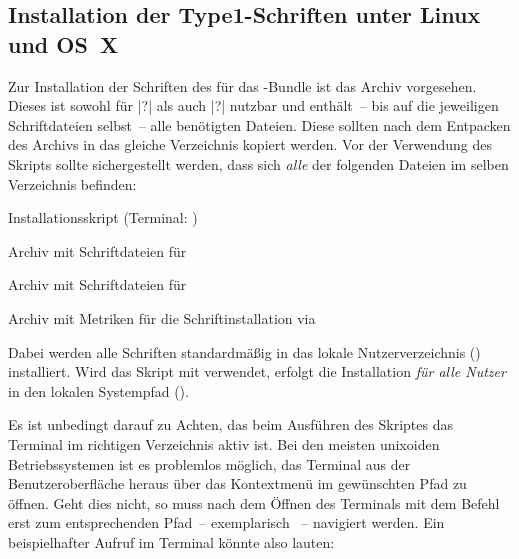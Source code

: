 \subsection{Installation der Type1-Schriften unter Linux und OS~X}
%
%
Zur Installation der Schriften des \CDs für das \TUDScript-Bundle ist das Archiv
%
{}
 vorgesehen. Dieses ist sowohl für |?| als auch 
|?| nutzbar und enthält~-- bis auf die jeweiligen 
Schriftdateien selbst~-- alle benötigten Dateien. Diese sollten nach dem 
Entpacken des Archivs in das gleiche Verzeichnis kopiert werden. Vor der 
Verwendung des Skripts  sollte sichergestellt 
werden, dass sich \emph{alle} der folgenden Dateien im selben Verzeichnis 
befinden:
%
\begin{description}[labelwidth=\tempdim,labelsep=1em]
  \item[\File{tudscr\_fonts\_install.sh}]Installationsskript
    (Terminal: )
  \item[\File{Univers\_PS.zip}]Archiv mit Schriftdateien für \Univers
  \item[\File{DIN\_Bd\_PS.zip}]Archiv mit Schriftdateien für \DIN
  \item[\File{tudscr\_fonts\_install.zip}]Archiv mit Metriken für die
    Schriftinstallation via 
\end{description}
%
Dabei werden alle Schriften standardmäßig in das lokale Nutzerverzeichnis 
() installiert. Wird das Skript mit  verwendet, 
erfolgt die Installation \emph{für alle Nutzer} in den lokalen Systempfad 
().

Es ist unbedingt darauf zu Achten, das beim Ausführen des Skriptes das Terminal 
im richtigen Verzeichnis aktiv ist. Bei den meisten unixoiden Betriebssystemen 
ist es problemlos möglich, das Terminal aus der Benutzeroberfläche heraus über 
das Kontextmenü im gewünschten Pfad zu öffnen. Geht dies nicht, so muss nach 
dem Öffnen des Terminals mit dem Befehl  erst zum entsprechenden 
Pfad~-- exemplarisch ~-- 
navigiert werden. Ein beispielhafter Aufruf im Terminal könnte also lauten:
%
\begin{quoting}
\newline
{}
\end{quoting}


